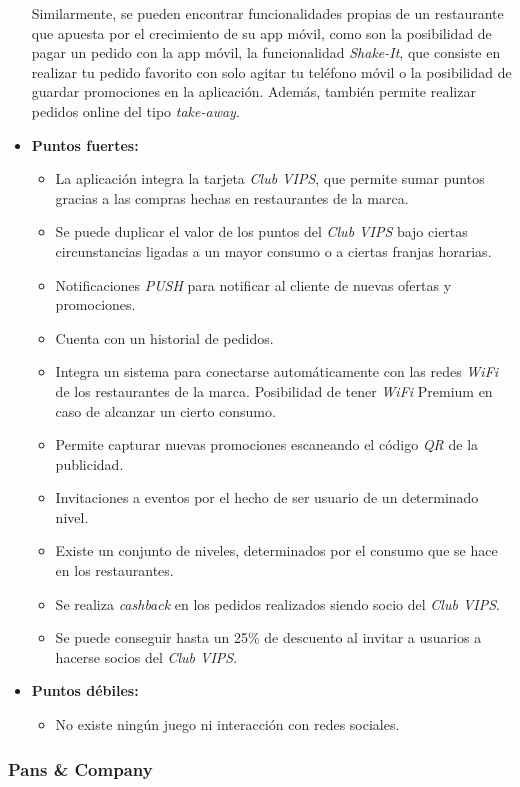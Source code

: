 \documentclass[twoside]{report}
\begin{document}
\begin{itemize}
Similarmente, se pueden encontrar funcionalidades propias de un restaurante que apuesta por el crecimiento de su app móvil, como son la posibilidad de pagar un pedido con la app móvil, la funcionalidad \textit{Shake-It}, que consiste en realizar tu pedido favorito con solo agitar tu teléfono móvil o la posibilidad de guardar promociones en la aplicación. Además, también permite realizar pedidos online del tipo \textit{take-away}.
\item \textbf{Puntos fuertes:}
	\begin{itemize}
	\item La aplicación integra la tarjeta \textit{Club VIPS}, que permite sumar puntos gracias a las compras hechas en restaurantes de la marca.
	\item Se puede duplicar el valor de los puntos del  \textit{Club VIPS} bajo ciertas circunstancias ligadas a un mayor consumo o a ciertas franjas horarias.
	\item Notificaciones \textit{PUSH} para notificar al cliente de nuevas ofertas y promociones.
	\item Cuenta con un historial de pedidos.
	\item Integra un sistema para conectarse automáticamente con las redes \textit{WiFi} de los restaurantes de la marca. Posibilidad de tener \textit{WiFi} Premium en caso de alcanzar un cierto consumo.
	\item Permite capturar nuevas promociones escaneando el código \textit{QR} de la publicidad.
	\item Invitaciones a eventos por el hecho de ser usuario de un determinado nivel.
	\item Existe un conjunto de niveles, determinados por el consumo que se hace en los restaurantes.
	\item Se realiza \textit{cashback} en los pedidos realizados siendo socio del \textit{Club VIPS}.
	\item Se puede conseguir hasta un 25\% de descuento al invitar a usuarios a hacerse socios del \textit{Club VIPS}.
	\end{itemize}
\item \textbf{Puntos débiles:}
	\begin{itemize}
	\item No existe ningún juego ni interacción con redes sociales.
	\end{itemize}
\end{itemize}

\subsubsection{Pans \& Company}
\end{document}
